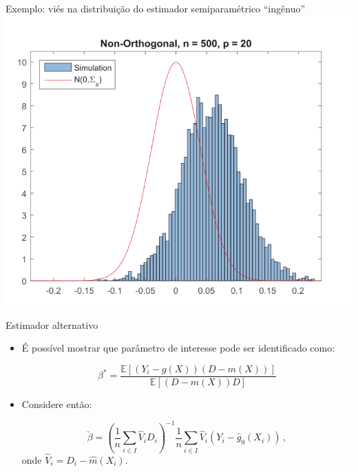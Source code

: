 \documentclass[11pt]{beamer}
\begin{document}
	\begin{frame}{Exemplo: viés  na distribuição do estimador semiparamétrico ``ingênuo''}
	\centering
	\includegraphics[scale=0.5]{graficos/naive.png}
	\end{frame}
	\begin{frame}{Estimador alternativo}
		\begin{itemize}
			\item É possível mostrar que parâmetro de interesse pode ser identificado como:
			
			$$\beta^*  =  \frac{\mathbb{E}[(Y_i - g(X))(D-m(X)) ]}{\mathbb{E}[(D-m(X))D]}$$
			\item Considere então:
			
			$$\check{\beta}=\left(\frac{1}{n} \sum_{i \in I} \hat{V}_{i} D_{i}\right)^{-1} \frac{1}{n} \sum_{i \in I} \hat{V}_{i}\left(Y_{i}-\hat{g}_{0}\left(X_{i}\right)\right)\,, $$
			onde $\hat{V}_i = D_i - \hat{m}(X_i)$.

			
		\end{itemize}
	\end{frame}
\end{document}
